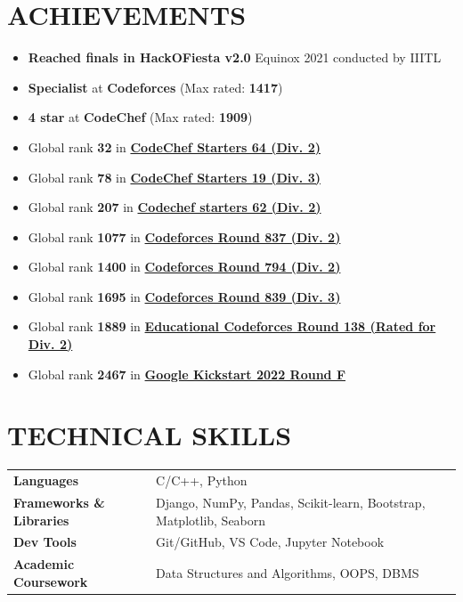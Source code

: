 \documentclass[12pt]{article}
\begin{document}
\section*{ACHIEVEMENTS}
\begin{itemize}[leftmargin=*, topsep=0pt,itemsep=2pt,partopsep=2pt, parsep=2pt]
	\item {\textbf{Reached finals in HackOFiesta v2.0} Equinox 2021 conducted by IIITL}
	\item \textbf{Specialist} at \textbf{Codeforces} (Max rated: \textbf{1417})
	\item \textbf{4 star} at \textbf{CodeChef} (Max rated: \textbf{1909})
	\item Global rank \textbf{32} in \href{https://www.codechef.com/rankings/START64B?search=tanishka125}{\textbf{CodeChef Starters 64 (Div. 2)}}
	\item Global rank \textbf{78} in \href{https://www.codechef.com/rankings/START19C?search=tanishka125}{\textbf{CodeChef Starters 19 (Div. 3)}}
	\item Global rank \textbf{207} in \href{https://www.codechef.com/rankings/START62B?search=tanishka125}{\textbf{Codechef starters 62 (Div. 2)}}
	\item Global rank \textbf{1077} in \href{https://codeforces.com/contest/1771/standings/participant/145587929#p145587929}{\textbf{Codeforces Round 837 (Div. 2)}}
	\item Global rank \textbf{1400} in \href{https://codeforces.com/contest/1686/standings/participant/133609891#p133609891}{\textbf{Codeforces Round 794 (Div. 2)}}
	\item Global rank \textbf{1695} in \href{https://codeforces.com/contest/1772/standings/participant/146151939#p146151939}{\textbf{Codeforces Round 839 (Div. 3)}}
	\item Global rank \textbf{1889} in \href{https://codeforces.com/contest/1749/standings/2/participant/142527940#p142527940}{\textbf{Educational Codeforces Round 138 (Rated for Div. 2)}} 
	\item Global rank \textbf{2467} in \href{https://codingcompetitions.withgoogle.com/kickstart/submissions/00000000008cb409/0000000000648019} {\textbf{Google Kickstart 2022 Round F}}
\end{itemize}

\begin{table}[h]
	\section*{TECHNICAL SKILLS}
	\centering
	\begin{tabularx}{\textwidth}{@{}ll}
		\textbf{Languages}               & C/C++, Python                                                       \\
		\textbf{Frameworks \& Libraries} & Django, NumPy, Pandas, Scikit-learn, Bootstrap, Matplotlib, Seaborn \\
		\textbf{Dev Tools}               & Git/GitHub, VS Code, Jupyter Notebook                               \\ 
		\textbf{Academic Coursework}     & Data Structures and Algorithms, OOPS, DBMS                          \\
	\end{tabularx}
\end{table}
\end{document}
